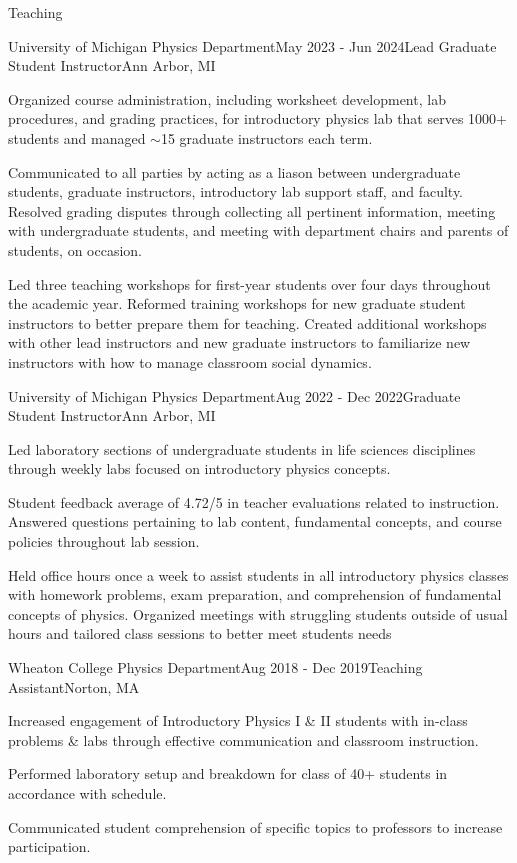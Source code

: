 \documentclass{resume} %
\begin{document}
\begin{rSection}{Teaching}

\begin{rSubsection}{University of Michigan Physics Department}{May 2023 - Jun 2024}{Lead Graduate Student Instructor}{Ann Arbor, MI}
    \item Organized course administration, including worksheet development, lab procedures, and grading practices, for introductory physics lab that serves 1000+ students and managed $\sim$15 graduate instructors each term.
    \item Communicated to all parties by acting as a liason between undergraduate students, graduate instructors, introductory lab support staff, and faculty. Resolved grading disputes through collecting all pertinent information, meeting with undergraduate students, and meeting with department chairs and parents of students, on occasion.
    \item Led three teaching workshops for first-year students over four days throughout the academic year. Reformed training workshops for new graduate student instructors to better prepare them for teaching. Created additional workshops with other lead instructors and new graduate instructors to familiarize new instructors with how to manage classroom social dynamics. 
\end{rSubsection}

\begin{rSubsection}{University of Michigan Physics Department}{Aug 2022 - Dec 2022}{Graduate Student Instructor}{Ann Arbor, MI}
    \item Led laboratory sections of undergraduate students in life sciences disciplines through weekly labs focused on introductory physics concepts. 
    \item Student feedback average of 4.72/5 in teacher evaluations related to instruction. Answered questions pertaining to lab content, fundamental concepts, and course policies throughout lab session.
    \item Held office hours once a week to assist students in all introductory physics classes with homework problems, exam preparation, and comprehension of fundamental concepts of physics. Organized meetings with struggling students outside of usual hours and tailored class sessions to better meet students needs

\end{rSubsection}

\begin{rSubsection}{Wheaton College Physics Department}{Aug 2018 - Dec 2019}{Teaching Assistant}{Norton, MA}
    \item Increased engagement of Introductory Physics I \& II students with in-class problems \& labs through effective communication and classroom instruction.
    \item Performed laboratory setup and breakdown for class of 40+ students in accordance with schedule.
    \item Communicated student comprehension of specific topics to professors to increase participation.


\end{rSubsection}
\end{rSection}
\end{document}
